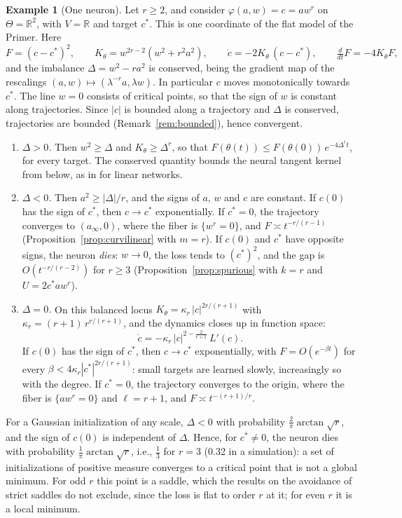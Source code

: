 \documentclass[11pt]{article}
\theoremstyle{definition}
\newtheorem{example}[lemma]{Example}
\theoremstyle{remark}
\newcommand{\R}{\mathbb{R}}
\begin{document}
\begin{example}[One neuron]\label{ex:neuron}
Let $r\ge2$, and consider $\varphi(a,w)=c=aw^r$ on $\Theta=\R^2$, with $V=\R$ and target $c^*$. This is one coordinate of the flat model of the Primer. Here
\[
F=(c-c^*)^2,\qquad K_\theta=w^{2r-2}(w^2+r^2a^2),\qquad\dot c=-2K_\theta\,(c-c^*),\qquad\tfrac{d}{dt}F=-4K_\theta F ,
\]
and the imbalance $\Delta=w^2-ra^2$ is conserved, being the gradient map of the rescalings $(a,w)\mapsto(\lambda^{-r}a,\lambda w)$. In particular $c$ moves monotonically towards $c^*$. The line $w=0$ consists of critical points, so that the sign of $w$ is constant along trajectories. Since $|c|$ is bounded along a trajectory and $\Delta$ is conserved, trajectories are bounded (Remark~\ref{rem:bounded}), hence convergent.
\begin{enumerate}[label=\textup{(\alph*)},leftmargin=2.6em]
\item \emph{$\Delta>0$.} Then $w^2\ge\Delta$ and $K_\theta\ge\Delta^r$, so that $F(\theta(t))\le F(\theta(0))\,e^{-4\Delta^rt}$, for every target. The conserved quantity bounds the neural tangent kernel from below, as in \cite{MTVM21} for linear networks.
\item \emph{$\Delta<0$.} Then $a^2\ge|\Delta|/r$, and the signs of $a$, $w$ and $c$ are constant. If $c(0)$ has the sign of $c^*$, then $c\to c^*$ exponentially. If $c^*=0$, the trajectory converges to $(a_\infty,0)$, where the fiber is $\{w^r=0\}$, and $F\asymp t^{-r/(r-1)}$ (Proposition~\ref{prop:curvilinear} with $m=r$). If $c(0)$ and $c^*$ have opposite signs, the neuron \emph{dies}: $w\to0$, the loss tends to $(c^*)^2$, and the gap is $O(t^{-r/(r-2)})$ for $r\ge3$ (Proposition~\ref{prop:spurious} with $k=r$ and $U=2c^*aw^r$).
\item \emph{$\Delta=0$.} On this balanced locus $K_\theta=\kappa_r\,|c|^{2r/(r+1)}$ with $\kappa_r=(r+1)\,r^{r/(r+1)}$, and the dynamics closes up in function space:
\begin{equation}\label{eq:balanced}
\dot c=-\kappa_r\,|c|^{2-\frac2{r+1}}\,L'(c).
\end{equation}
If $c(0)$ has the sign of $c^*$, then $c\to c^*$ exponentially, with $F=O(e^{-\beta t})$ for every $\beta<4\kappa_r|c^*|^{2r/(r+1)}$: small targets are learned slowly, increasingly so with the degree. If $c^*=0$, the trajectory converges to the origin, where the fiber is $\{aw^r=0\}$ and $\ell=r+1$, and $F\asymp t^{-(r+1)/r}$.
\end{enumerate}
For a Gaussian initialization of any scale, $\Delta<0$ with probability $\frac2\pi\arctan\sqrt r$, and the sign of $c(0)$ is independent of $\Delta$. Hence, for $c^*\ne0$, the neuron dies with probability $\frac1\pi\arctan\sqrt r$, i.e., $\frac13$ for $r=3$ (0.32 in a simulation): a set of initializations of positive measure converges to a critical point that is not a global minimum. For odd $r$ this point is a saddle, which the results on the avoidance of strict saddles \cite{LSJR16} do not exclude, since the loss is flat to order $r$ at it; for even $r$ it is a local minimum.
\end{example}
\end{document}
